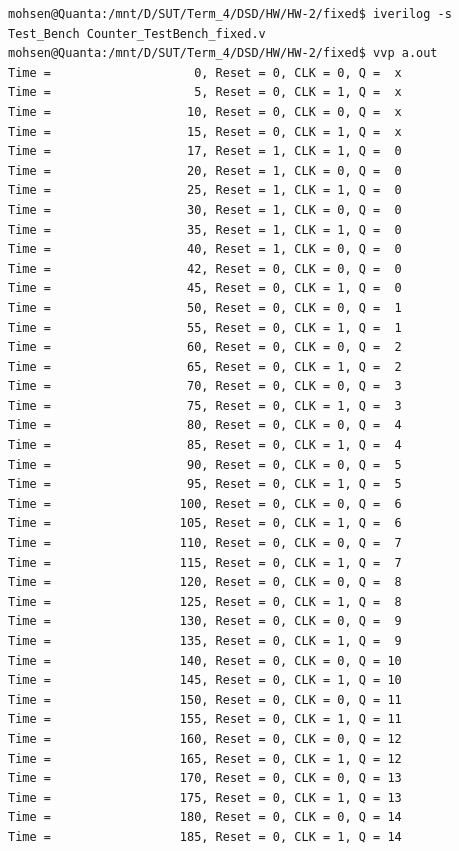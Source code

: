 \begin{latin}
    \begin{lstlisting}[basicstyle=\ttfamily\small, breaklines=true, postbreak=\mbox{\textcolor{red}{$\hookrightarrow$}\space}]
mohsen@Quanta:/mnt/D/SUT/Term_4/DSD/HW/HW-2/fixed$ iverilog -s Test_Bench Counter_TestBench_fixed.v 
mohsen@Quanta:/mnt/D/SUT/Term_4/DSD/HW/HW-2/fixed$ vvp a.out 
Time =                    0, Reset = 0, CLK = 0, Q =  x
Time =                    5, Reset = 0, CLK = 1, Q =  x
Time =                   10, Reset = 0, CLK = 0, Q =  x
Time =                   15, Reset = 0, CLK = 1, Q =  x
Time =                   17, Reset = 1, CLK = 1, Q =  0
Time =                   20, Reset = 1, CLK = 0, Q =  0
Time =                   25, Reset = 1, CLK = 1, Q =  0
Time =                   30, Reset = 1, CLK = 0, Q =  0
Time =                   35, Reset = 1, CLK = 1, Q =  0
Time =                   40, Reset = 1, CLK = 0, Q =  0
Time =                   42, Reset = 0, CLK = 0, Q =  0
Time =                   45, Reset = 0, CLK = 1, Q =  0
Time =                   50, Reset = 0, CLK = 0, Q =  1
Time =                   55, Reset = 0, CLK = 1, Q =  1
Time =                   60, Reset = 0, CLK = 0, Q =  2
Time =                   65, Reset = 0, CLK = 1, Q =  2
Time =                   70, Reset = 0, CLK = 0, Q =  3
Time =                   75, Reset = 0, CLK = 1, Q =  3
Time =                   80, Reset = 0, CLK = 0, Q =  4
Time =                   85, Reset = 0, CLK = 1, Q =  4
Time =                   90, Reset = 0, CLK = 0, Q =  5
Time =                   95, Reset = 0, CLK = 1, Q =  5
Time =                  100, Reset = 0, CLK = 0, Q =  6
Time =                  105, Reset = 0, CLK = 1, Q =  6
Time =                  110, Reset = 0, CLK = 0, Q =  7
Time =                  115, Reset = 0, CLK = 1, Q =  7
Time =                  120, Reset = 0, CLK = 0, Q =  8
Time =                  125, Reset = 0, CLK = 1, Q =  8
Time =                  130, Reset = 0, CLK = 0, Q =  9
Time =                  135, Reset = 0, CLK = 1, Q =  9
Time =                  140, Reset = 0, CLK = 0, Q = 10
Time =                  145, Reset = 0, CLK = 1, Q = 10
Time =                  150, Reset = 0, CLK = 0, Q = 11
Time =                  155, Reset = 0, CLK = 1, Q = 11
Time =                  160, Reset = 0, CLK = 0, Q = 12
Time =                  165, Reset = 0, CLK = 1, Q = 12
Time =                  170, Reset = 0, CLK = 0, Q = 13
Time =                  175, Reset = 0, CLK = 1, Q = 13
Time =                  180, Reset = 0, CLK = 0, Q = 14
Time =                  185, Reset = 0, CLK = 1, Q = 14

\end{lstlisting}
\end{latin}

